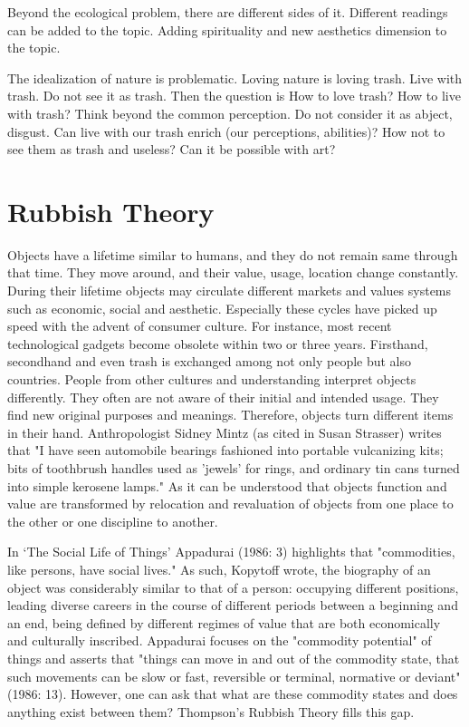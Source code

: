 Beyond the ecological problem, there are different sides of it. Different readings can be added to the topic. Adding spirituality and new aesthetics dimension to the topic. 

The idealization of nature is problematic. Loving nature is loving trash. Live with trash. Do not see it as trash. Then the question is How to love trash? How to live with trash? Think beyond the common perception. Do not consider it as abject, disgust. Can live with our trash enrich (our perceptions, abilities)? How not to see them as trash and useless? Can it be possible with art?





%
%
\section{Rubbish Theory}
Objects have a lifetime similar to humans, and they do not remain same through that time. They move around, and their value, usage, location change constantly. During their lifetime objects may circulate different markets and values systems such as economic, social and aesthetic. Especially these cycles have picked up speed with the advent of consumer culture. For instance, most recent technological gadgets become obsolete within two or three years. Firsthand, secondhand and even trash is exchanged among not only people but also countries. People from other cultures and understanding interpret objects differently. They often are not aware of their initial and intended usage. They find new original purposes and meanings. Therefore, objects turn different items in their hand. Anthropologist Sidney Mintz (as cited in Susan Strasser) writes that "I have seen automobile bearings fashioned into portable vulcanizing kits; bits of toothbrush handles used as 'jewels' for rings, and ordinary tin cans turned into simple kerosene lamps." As it can be understood that objects function and value are transformed by relocation and revaluation of objects from one place to the other or one discipline to another. 

In ‘The Social Life of Things’ Appadurai (1986: 3) highlights that "commodities, like persons, have social lives." As such, Kopytoff wrote, the biography of an object was considerably similar to that of a person: occupying different positions, leading diverse careers in the course of different periods between a beginning and an end, being defined by different regimes of value that are both economically and culturally inscribed. Appadurai focuses on the "commodity potential" of things and asserts that "things can move in and out of the commodity state, that such movements can be slow or fast, reversible or terminal, normative or deviant" (1986: 13). However, one can ask that what are these commodity states and does anything exist between them? Thompson’s Rubbish Theory fills this gap.

